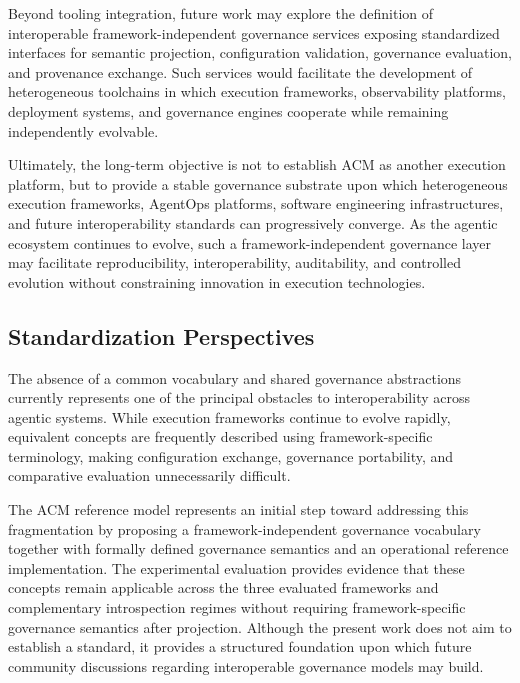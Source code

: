 \documentclass[10pt]{article}
\begin{document}
Beyond tooling integration, future work may explore the definition of interoperable framework-independent governance services exposing standardized interfaces for semantic projection, configuration validation, governance evaluation, and provenance exchange. Such services would facilitate the development of heterogeneous toolchains in which execution frameworks, observability platforms, deployment systems, and governance engines cooperate while remaining independently evolvable.

Ultimately, the long-term objective is not to establish ACM as another execution platform, but to provide a stable governance substrate upon which heterogeneous execution frameworks, AgentOps platforms, software engineering infrastructures, and future interoperability standards can progressively converge. As the agentic ecosystem continues to evolve, such a framework-independent governance layer may facilitate reproducibility, interoperability, auditability, and controlled evolution without constraining innovation in execution technologies.

\subsection{Standardization Perspectives}
\label{sec:future_standardization}

The absence of a common vocabulary and shared governance abstractions currently represents one of the principal obstacles to interoperability across agentic systems. While execution frameworks continue to evolve rapidly, equivalent concepts are frequently described using framework-specific terminology, making configuration exchange, governance portability, and comparative evaluation unnecessarily difficult.

The ACM reference model represents an initial step toward addressing this fragmentation by proposing a framework-independent governance vocabulary together with formally defined governance semantics and an operational reference implementation. The experimental evaluation provides evidence that these concepts remain applicable across the three evaluated frameworks and complementary introspection regimes without requiring framework-specific governance semantics after projection.
Although the present work does not aim to establish a standard, it provides a structured foundation upon which future community discussions regarding interoperable governance models may build.
\end{document}
